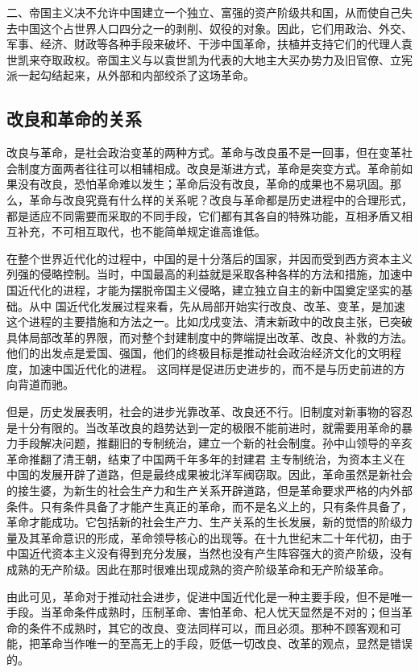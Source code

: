 \documentclass{article}
\begin{document}
\begin{CJK}{UTF8}{song}
二、帝国主义决不允许中国建立一个独立、富强的资产阶级共和国，从而使自己失去中国这个占世界人口四分之一的剥削、奴役的对象。因此，它们用政治、外交、军事、经济、财政等各种手段来破坏、干涉中国革命，扶植并支持它们的代理人袁世凯来夺取政权。帝国主义与以袁世凯为代表的大地主大买办势力及旧官僚、立宪派一起勾结起来，从外部和内部绞杀了这场革命。
\subsection{改良和革命的关系}
改良与革命，是社会政治变革的两种方式。革命与改良虽不是一回事，但在变革社会制度方面两者往往可以相辅相成。改良是渐进方式，革命是突变方式。革命前如果没有改良，恐怕革命难以发生；革命后没有改良，革命的成果也不易巩固。那么，革命与改良究竟有什么样的关系呢？改良与革命都是历史进程中的合理形式，都是适应不同需要而采取的不同手段，它们都有其各自的特殊功能，互相矛盾又相互补充，不可相互取代，也不能简单规定谁高谁低。

在整个世界近代化的过程中，中国的是十分落后的国家，并因而受到西方资本主义列强的侵略控制。当时，中国最高的利益就是采取各种各样的方法和措施，加速中国近代化的进程，才能为摆脱帝国主义侵略，建立独立自主的新中国奠定坚实的基础。从中 国近代化发展过程来看，先从局部开始实行改良、改革、变革，是加速这个进程的主要措施和方法之一。比如戊戌变法、清末新政中的改良主张，已突破具体局部改革的界限，而对整个封建制度中的弊端提出改革、改良、补救的方法。他们的出发点是爱国、强国，他们的终极目标是推动社会政治经济文化的文明程度，加速中国近代化的进程。 这同样是促进历史进步的，而不是与历史前进的方向背道而驰。

但是，历史发展表明，社会的进步光靠改革、改良还不行。旧制度对新事物的容忍是十分有限的。当改革改良的趋势达到一定的极限不能前进时，就需要用革命的暴力手段解决问题，推翻旧的专制统治，建立一个新的社会制度。孙中山领导的辛亥革命推翻了清王朝，结束了中国两千年多年的封建君 主专制统治，为资本主义在中国的发展开辟了道路，但是最终成果被北洋军阀窃取。因此，革命虽然是新社会的接生婆，为新生的社会生产力和生产关系开辟道路，但是革命要求严格的内外部条件。只有条件具备了才能产生真正的革命，而不是名义上的，只有条件具备了，革命才能成功。它包括新的社会生产力、生产关系的生长发展，新的觉悟的阶级力量及其革命意识的形成，革命领导核心的出现等。在十九世纪末二十年代初，由于中国近代资本主义没有得到充分发展，当然也没有产生阵容强大的资产阶级，没有成熟的无产阶级。因此在那时很难出现成熟的资产阶级革命和无产阶级革命。

由此可见，革命对于推动社会进步，促进中国近代化是一种主要手段，但不是唯一手段。当革命条件成熟时，压制革命、害怕革命、杞人忧天显然是不对的；但当革命的条件不成熟时，其它的改良、变法同样可以，而且必须。那种不顾客观和可能，把革命当作唯一的至高无上的手段，贬低一切改良、改革的观点，显然是错误的。


\end{CJK}
\end{document}

